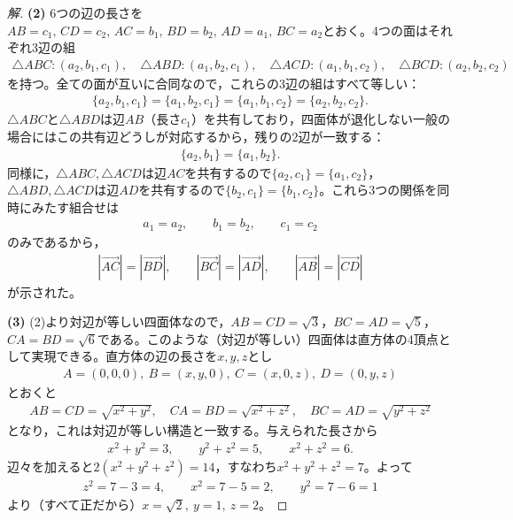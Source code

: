 \documentclass[../main.tex]{subfiles}
\begin{document}
\begin{proof}[解]
  \textbf{(2)} 6つの辺の長さを$AB=c_1,\,CD=c_2,\,AC=b_1,\,BD=b_2,\,AD=a_1,\,BC=a_2$とおく。4つの面はそれぞれ3辺の組
  \begin{align*}
    \triangle ABC:(a_2,b_1,c_1),\quad\triangle ABD:(a_1,b_2,c_1),\quad\triangle ACD:(a_1,b_1,c_2),\quad\triangle BCD:(a_2,b_2,c_2)
  \end{align*}
  を持つ。全ての面が互いに合同なので，これらの3辺の組はすべて等しい：
  \begin{align*}
    \{a_2,b_1,c_1\}=\{a_1,b_2,c_1\}=\{a_1,b_1,c_2\}=\{a_2,b_2,c_2\}.
  \end{align*}
  $\triangle ABC$と$\triangle ABD$は辺$AB$（長さ$c_1$）を共有しており，四面体が退化しない一般の場合にはこの共有辺どうしが対応するから，残りの2辺が一致する：
  \begin{align*}
    \{a_2,b_1\}=\{a_1,b_2\}.
  \end{align*}
  同様に，$\triangle ABC,\triangle ACD$は辺$AC$を共有するので$\{a_2,c_1\}=\{a_1,c_2\}$，$\triangle ABD,\triangle ACD$は辺$AD$を共有するので$\{b_2,c_1\}=\{b_1,c_2\}$。これら3つの関係を同時にみたす組合せは
  \begin{align*}
    a_1=a_2,\qquad b_1=b_2,\qquad c_1=c_2
  \end{align*}
  のみであるから，
  \begin{align*}
    |\overrightarrow{AC}|=|\overrightarrow{BD}|,\qquad |\overrightarrow{BC}|=|\overrightarrow{AD}|,\qquad|\overrightarrow{AB}|=|\overrightarrow{CD}|
  \end{align*}
  が示された。

  \textbf{(3)} (2)より対辺が等しい四面体なので，$AB=CD=\sqrt3$，$BC=AD=\sqrt5$，$CA=BD=\sqrt6$である。このような（対辺が等しい）四面体は直方体の4頂点として実現できる。直方体の辺の長さを$x,y,z$とし
  \begin{align*}
    A=(0,0,0),\ B=(x,y,0),\ C=(x,0,z),\ D=(0,y,z)
  \end{align*}
  とおくと
  \begin{align*}
    AB=CD=\sqrt{x^2+y^2},\quad CA=BD=\sqrt{x^2+z^2},\quad BC=AD=\sqrt{y^2+z^2}
  \end{align*}
  となり，これは対辺が等しい構造と一致する。与えられた長さから
  \begin{align*}
    x^2+y^2=3,\qquad y^2+z^2=5,\qquad x^2+z^2=6.
  \end{align*}
  辺々を加えると$2(x^2+y^2+z^2)=14$，すなわち$x^2+y^2+z^2=7$。よって
  \begin{align*}
    z^2=7-3=4,\qquad x^2=7-5=2,\qquad y^2=7-6=1
  \end{align*}
  より（すべて正だから）$x=\sqrt2,\ y=1,\ z=2$。


\end{proof}
\end{document}
